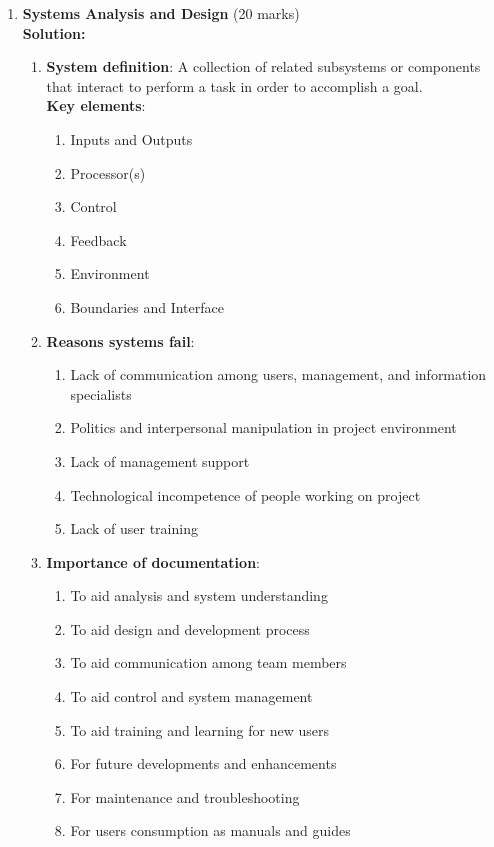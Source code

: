 \documentclass[12pt]{article}
\begin{document}
\begin{enumerate}[left=0pt, label=\bfseries Q\arabic*., start=1]
    \item \textbf{Systems Analysis and Design} \hfill (20 marks)\\
    \textbf{Solution:}
    \begin{enumerate}[label=(\alph*)]
        \item \textbf{System definition}: A collection of related subsystems or components that interact to perform a task in order to accomplish a goal.\\
        \textbf{Key elements}:
        \begin{enumerate}[label=\roman*.]
            \item Inputs and Outputs
            \item Processor(s)
            \item Control
            \item Feedback
            \item Environment
            \item Boundaries and Interface
        \end{enumerate}
        
        \item \textbf{Reasons systems fail}:
        \begin{enumerate}[label=\roman*.]
            \item Lack of communication among users, management, and information specialists
            \item Politics and interpersonal manipulation in project environment
            \item Lack of management support
            \item Technological incompetence of people working on project
            \item Lack of user training
        \end{enumerate}
        
        \item \textbf{Importance of documentation}:
        \begin{enumerate}[label=\roman*.]
            \item To aid analysis and system understanding
            \item To aid design and development process
            \item To aid communication among team members
            \item To aid control and system management
            \item To aid training and learning for new users
            \item For future developments and enhancements
            \item For maintenance and troubleshooting
            \item For users consumption as manuals and guides
        \end{enumerate}
        

\end{enumerate}
\end{enumerate}
\end{document}
